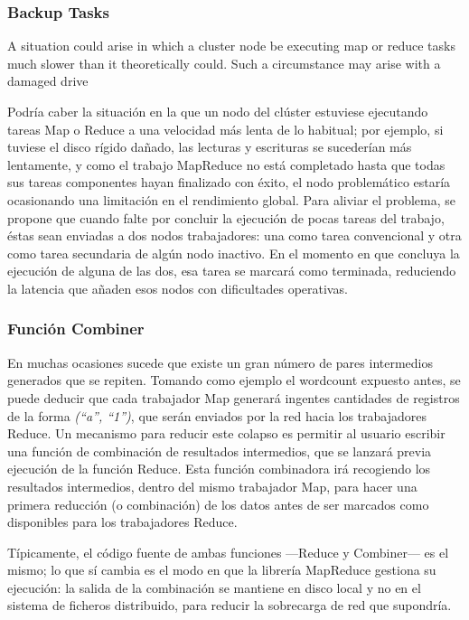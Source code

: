 \subsubsection{Backup Tasks}\label{subsubsec:secundarias}

\noindent A situation could arise in which a cluster node be executing map or reduce tasks much slower than it theoretically could. Such a circumstance may arise with a damaged drive 

\noindent Podr\'ia caber la situaci\'on en la que un nodo del cl\'uster estuviese ejecutando tareas Map o Reduce a una velocidad m\'as lenta de lo habitual; por ejemplo, si tuviese el disco r\'igido da\~nado, las lecturas y escrituras se suceder\'ian m\'as lentamente, y como el trabajo MapReduce no est\'a completado hasta que todas sus tareas componentes hayan finalizado con \'exito, el nodo problem\'atico estar\'ia ocasionando una limitaci\'on en el rendimiento global. Para aliviar el problema, se propone que cuando falte por concluir la ejecuci\'on de pocas ta\-re\-as del trabajo, \'estas sean enviadas a dos nodos trabajadores: una como tarea convencional y otra como tarea secundaria de alg\'un nodo inactivo. En el momento en que concluya la ejecuci\'on de alguna de las dos, esa tarea se marcar\'a como terminada, reduciendo la latencia que a\~naden esos nodos con dificultades operativas.


\subsubsection{Funci\'on Combiner}\label{subsubsec:combiner}
\noindent En muchas ocasiones sucede que existe un gran n\'umero de pares intermedios generados que se repiten. Tomando como ejemplo el wordcount expuesto antes, se puede deducir que cada trabajador Map generar\'a ingentes cantidades de registros de la forma \emph{(``a'', ``1'')}, que ser\'an enviados por la red hacia los trabajadores Reduce. Un mecanismo para reducir este colapso es permitir al usuario escribir una funci\'on de combinaci\'on de resultados intermedios, que se lanzar\'a previa ejecuci\'on de la funci\'on Reduce. Esta funci\'on combinadora ir\'a recogiendo los resultados intermedios, dentro del mismo trabajador Map, para hacer una primera reducci\'on (o combinaci\'on) de los datos antes de ser marcados como disponibles para los trabajadores Reduce.\newline

T\'ipicamente, el c\'odigo fuente de ambas funciones ---Reduce y Combiner--- es el mismo; lo que s\'i cambia es el modo en que la librer\'ia MapReduce gestiona su ejecuci\'on: la salida de la combinaci\'on se mantiene en disco local y no en el sistema de ficheros distribuido, para reducir la sobrecarga de red que supondr\'ia.


